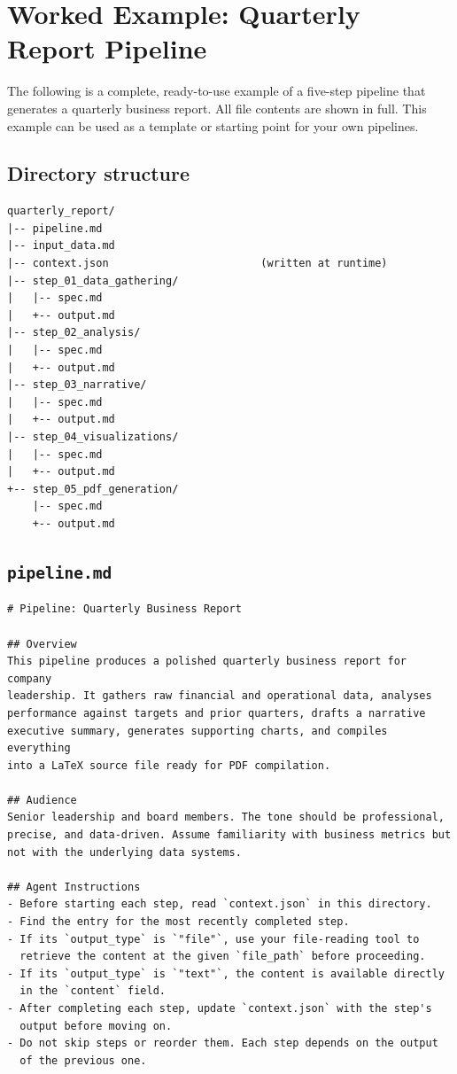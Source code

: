 \documentclass[12pt, a4paper]{article}
\begin{document}
\section{Worked Example: Quarterly Report Pipeline}

The following is a complete, ready-to-use example of a five-step pipeline that generates a quarterly business report. All file contents are shown in full. This example can be used as a template or starting point for your own pipelines.

\subsection{Directory structure}

\begin{lstlisting}
quarterly_report/
|-- pipeline.md
|-- input_data.md
|-- context.json                        (written at runtime)
|-- step_01_data_gathering/
|   |-- spec.md
|   +-- output.md
|-- step_02_analysis/
|   |-- spec.md
|   +-- output.md
|-- step_03_narrative/
|   |-- spec.md
|   +-- output.md
|-- step_04_visualizations/
|   |-- spec.md
|   +-- output.md
+-- step_05_pdf_generation/
    |-- spec.md
    +-- output.md
\end{lstlisting}

\subsection{\texttt{pipeline.md}}

\begin{lstlisting}[language={}]
# Pipeline: Quarterly Business Report

## Overview
This pipeline produces a polished quarterly business report for company
leadership. It gathers raw financial and operational data, analyses
performance against targets and prior quarters, drafts a narrative
executive summary, generates supporting charts, and compiles everything
into a LaTeX source file ready for PDF compilation.

## Audience
Senior leadership and board members. The tone should be professional,
precise, and data-driven. Assume familiarity with business metrics but
not with the underlying data systems.

## Agent Instructions
- Before starting each step, read `context.json` in this directory.
- Find the entry for the most recently completed step.
- If its `output_type` is `"file"`, use your file-reading tool to
  retrieve the content at the given `file_path` before proceeding.
- If its `output_type` is `"text"`, the content is available directly
  in the `content` field.
- After completing each step, update `context.json` with the step's
  output before moving on.
- Do not skip steps or reorder them. Each step depends on the output
  of the previous one.
\end{lstlisting}
\end{document}

